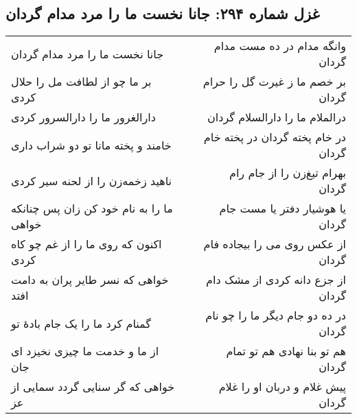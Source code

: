 \begin{center}
\section*{غزل شماره ۲۹۴: جانا نخست ما را مرد مدام گردان}
\label{sec:294}
\begin{longtable}{l p{0.5cm} r}
جانا نخست ما را مرد مدام گردان
&&
وانگه مدام در ده مست مدام گردان
\\
بر ما چو از لطافت مل را حلال کردی
&&
بر خصم ما ز غیرت گل را حرام گردان
\\
دارالغرور ما را دارالسرور کردی
&&
درالملام ما را دارالسلام گردان
\\
خامند و پخته مانا تو دو شراب داری
&&
در خام پخته گردان در پخته خام گردان
\\
ناهید زخمه‌زن را از لحنه سیر کردی
&&
بهرام تیغ‌زن را از جام رام گردان
\\
ما را به نام خود کن زان پس چنانکه خواهی
&&
یا هوشیار دفتر یا مست جام گردان
\\
اکنون که روی ما را از غم چو کاه کردی
&&
از عکس روی می را بیجاده فام گردان
\\
خواهی که نسر طایر پران به دامت افتد
&&
از جزع دانه کردی از مشک دام گردان
\\
گمنام کرد ما را یک جام بادهٔ تو
&&
در ده دو جام دیگر ما را چو نام گردان
\\
از ما و خدمت ما چیزی نخیزد ای جان
&&
هم تو بنا نهادی هم تو تمام گردان
\\
خواهی که گر سنایی گردد سمایی از عز
&&
پیش غلام و دربان او را غلام گردان
\\
\end{longtable}
\end{center}
